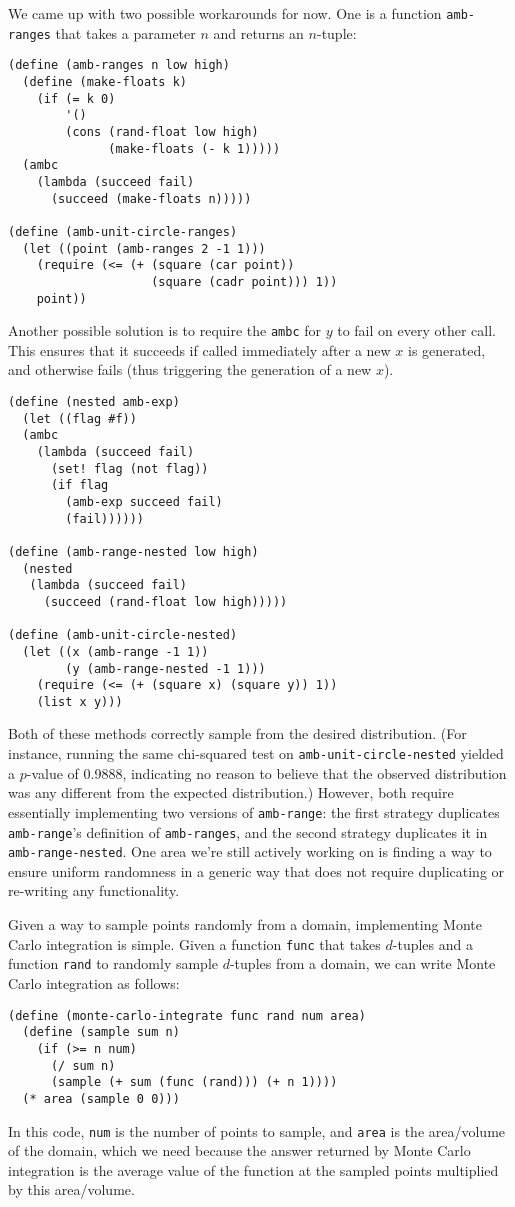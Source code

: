 \documentclass{article}
\begin{document}
We came up with two possible workarounds for now. One is a function
\texttt{amb-ranges} that takes a parameter $n$ and returns an $n$-tuple:
\begin{lstlisting}
(define (amb-ranges n low high)
  (define (make-floats k)
    (if (= k 0)
        '()
        (cons (rand-float low high)
              (make-floats (- k 1)))))
  (ambc
    (lambda (succeed fail)
      (succeed (make-floats n)))))

(define (amb-unit-circle-ranges)
  (let ((point (amb-ranges 2 -1 1)))
    (require (<= (+ (square (car point))
                    (square (cadr point))) 1))
    point))
\end{lstlisting}

Another possible solution is to require the \texttt{ambc} for $y$ to fail on
every other call. This ensures that it succeeds if called immediately after a
new $x$ is generated, and otherwise fails (thus triggering the generation of a
new $x$).
\begin{lstlisting}
(define (nested amb-exp)
  (let ((flag #f))
  (ambc
    (lambda (succeed fail)
      (set! flag (not flag))
      (if flag
        (amb-exp succeed fail)
        (fail))))))

(define (amb-range-nested low high)
  (nested
   (lambda (succeed fail)
     (succeed (rand-float low high)))))

(define (amb-unit-circle-nested)
  (let ((x (amb-range -1 1))
        (y (amb-range-nested -1 1)))
    (require (<= (+ (square x) (square y)) 1))
    (list x y)))
\end{lstlisting}

Both of these methods correctly sample from the desired distribution. (For
instance, running the same chi-squared test on \texttt{amb-unit-circle-nested}
yielded a $p$-value of 0.9888, indicating no reason to believe that the
observed distribution was any different from the expected distribution.)
However, both require essentially implementing two versions of
\texttt{amb-range}: the first strategy duplicates \texttt{amb-range}'s
definition of \texttt{amb-ranges}, and the second strategy duplicates it in
\texttt{amb-range-nested}. One area we're still actively working on is finding
a way to ensure uniform randomness in a generic way that does not require
duplicating or re-writing any functionality.

Given a way to sample points randomly from a domain, implementing Monte Carlo
integration is simple. Given a function \texttt{func} that takes $d$-tuples and
a function \texttt{rand} to randomly sample $d$-tuples from a domain, we can
write Monte Carlo integration as follows:
\begin{lstlisting}
(define (monte-carlo-integrate func rand num area)
  (define (sample sum n)
    (if (>= n num)
      (/ sum n)
      (sample (+ sum (func (rand))) (+ n 1))))
  (* area (sample 0 0)))
\end{lstlisting}
In this code, \texttt{num} is the number of points to sample, and \texttt{area}
is the area/volume of the domain, which we need because the answer returned by
Monte Carlo integration is the average value of the function at the sampled
points multiplied by this area/volume.
\end{document}
